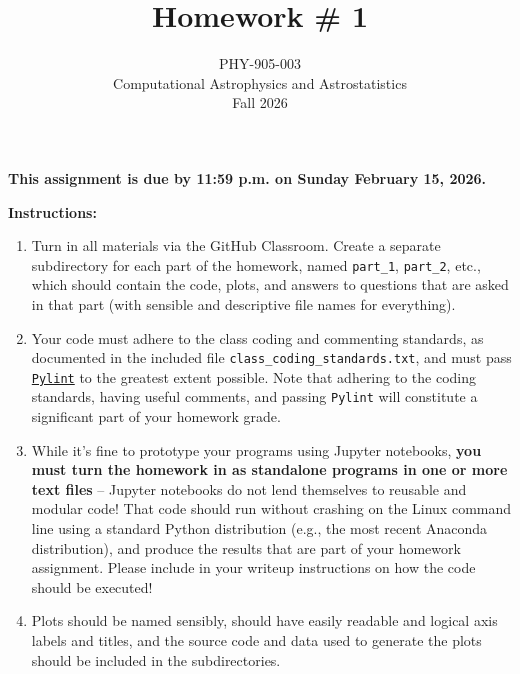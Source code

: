 \documentclass[10pt]{article}
\title{Homework \# 1}
\author{PHY-905-003\\Computational Astrophysics and
  Astrostatistics\\Fall 2026}
\date{} %
\begin{document}
 
\maketitle

\vspace{-5mm}

 
\centerline{
  {\large
    \textbf{This assignment is due by 11:59 p.m. on Sunday February 15,
      2026.}
  }
}

\vspace{5mm}

\noindent
\textbf{Instructions:}
\begin{enumerate}

\item Turn in all materials via the GitHub Classroom.  Create a
separate subdirectory for each part of the homework, named
\texttt{part\_1}, \texttt{part\_2}, etc., which should contain the
code, plots, and answers to questions that are asked in that part
(with sensible and descriptive file names for everything).

\item Your code must adhere to the class coding and commenting
standards, as documented in the included file
\texttt{class\_coding\_standards.txt}, and must pass
\href{https://pylint.readthedocs.io/en/latest/index.html}{\texttt{Pylint}}
to the greatest extent possible.  Note that adhering to the coding
standards, having useful comments, and passing \texttt{Pylint} will
constitute a significant part of your homework grade.

\item While it's fine to prototype your programs using Jupyter
notebooks, \textbf{you must turn the homework in as standalone
programs in one or more text files} -- Jupyter notebooks do not lend
themselves to reusable and modular code!  That code should run without
crashing on the Linux command line using a standard Python
distribution (e.g., the most recent Anaconda distribution), and
produce the results that are part of your homework assignment.  Please
include in your writeup instructions on how the code should be
executed!

\item Plots should be named sensibly, should have easily readable and
logical axis labels and titles, and the source code and data used to
generate the plots should be included in the subdirectories.

\end{enumerate}

\noindent\makebox[\linewidth]{\rule{0.76\paperwidth}{0.4pt}}
\end{document}
